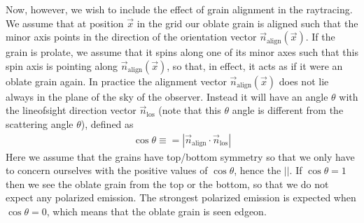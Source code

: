 \documentclass[letterpaper,10pt,english]{sphinxmanual}
\begin{document}
Now, however, we wish to include the effect of grain alignment in the
ray\sphinxhyphen{}tracing. We assume that at position \(\vec x\) in the grid our oblate
grain is aligned such that the minor axis points in the direction of the
orientation vector \(\vec n_{\mathrm{align}}(\vec x)\). If the grain is
prolate, we assume that it spins along one of its minor axes such that this
spin axis is pointing along \(\vec n_{\mathrm{align}}(\vec x)\), so that, in
effect, it acts as if it were an oblate grain again. In practice the
alignment vector \(\vec n_{\mathrm{align}}(\vec x)\) does not lie always in
the plane of the sky of the observer. Instead it will have an angle \(\theta\)
with the line\sphinxhyphen{}of\sphinxhyphen{}sight direction vector \(\vec n_{\mathrm{los}}\) (note that
this \(\theta\) angle is different from the scattering angle \(\theta\)),
defined as
\begin{equation*}
\begin{split}\cos\theta \equiv = \left|\vec n_{\mathrm{align}}\cdot
\vec n_{\mathrm{los}}\right|\end{split}
\end{equation*}
Here we assume that the grains have top/bottom symmetry so that we only have to
concern ourselves with the positive values of \(\cos\theta\), hence the
\(||\). If \(\cos\theta=1\) then we see the oblate grain from the top or
the bottom, so that we do not expect any polarized emission. The strongest
polarized emission is expected when \(\cos\theta=0\), which means that the
oblate grain is seen edge\sphinxhyphen{}on.
\end{document}
